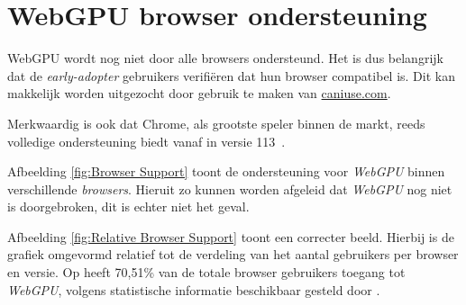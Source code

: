 \section{WebGPU browser ondersteuning}

WebGPU wordt nog niet door alle browsers ondersteund. Het is dus belangrijk dat de \textit{early-adopter} gebruikers verifiëren dat hun browser compatibel is. Dit kan makkelijk worden uitgezocht door gebruik te maken van \href{https://caniuse.com/webgpu}{caniuse.com}.

\bigbreak{}

Merkwaardig is ook dat Chrome, als grootste speler binnen de markt, reeds volledige ondersteuning biedt vanaf in versie 113~\autocite{Deveria2024}.

\bigbreak{}

Afbeelding \ref{fig:Browser Support} toont de ondersteuning voor \textit{WebGPU} binnen verschillende \textit{browsers}. Hieruit zo kunnen worden afgeleid dat \textit{WebGPU} nog niet is doorgebroken, dit is echter niet het geval.

\bigbreak{}
\date{}

Afbeelding \ref{fig:Relative Browser Support} toont een correcter beeld. Hierbij is de grafiek omgevormd relatief tot de verdeling van het aantal gebruikers per browser en versie. Op   heeft 70,51\% van de totale browser gebruikers toegang tot \textit{WebGPU}, volgens statistische informatie beschikbaar gesteld door \textcite{Deveria2024}.